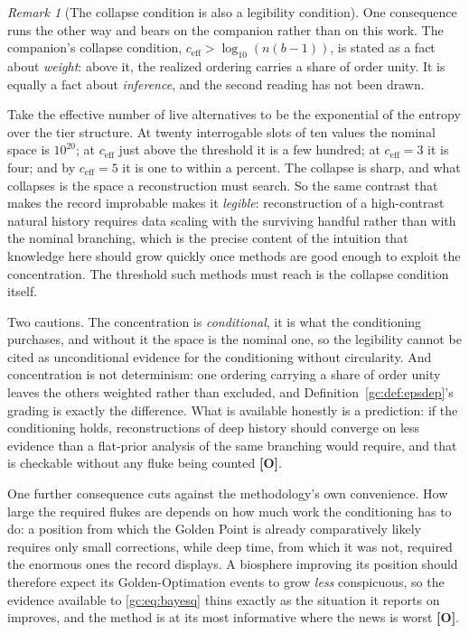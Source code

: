 \documentclass[11pt]{article}
\numberwithin{equation}{section}
\theoremstyle{plain}
\theoremstyle{definition}
\theoremstyle{remark}
\newtheorem{remark}[theorem]{Remark}
\begin{document}
\begin{remark}[The collapse condition is also a legibility condition]
\label{gc:rem:legibility}
One consequence runs the other way and bears on the companion rather than
on this work. The companion's collapse condition,
$c_{\mathrm{eff}}>\log_{10}(n(b-1))$, is stated as a fact about
\emph{weight}: above it, the realized ordering carries a share of order
unity. It is equally a fact about \emph{inference}, and the second
reading has not been drawn.

Take the effective number of live alternatives to be the exponential of
the entropy over the tier structure. At twenty interrogable slots of ten
values the nominal space is $10^{20}$; at $c_{\mathrm{eff}}$ just above
the threshold it is a few hundred; at $c_{\mathrm{eff}}=3$ it is four;
and by $c_{\mathrm{eff}}=5$ it is one to within a percent. The collapse
is sharp, and what collapses is the space a reconstruction must search.
So the same contrast that makes the record improbable makes it
\emph{legible}: reconstruction of a high-contrast natural history
requires data scaling with the surviving handful rather than with the
nominal branching, which is the precise content of the intuition that
knowledge here should grow quickly once methods are good enough to
exploit the concentration. The threshold such methods must reach is the
collapse condition itself.

Two cautions. The concentration is \emph{conditional}, it is what the
conditioning purchases, and without it the space is the nominal one, so the legibility cannot be cited as unconditional evidence for the
conditioning without circularity. And concentration is not determinism:
one ordering carrying a share of order unity leaves the others weighted
rather than excluded, and Definition~\ref{gc:def:epsdep}'s grading is exactly the
difference. What is available honestly is a prediction: if the
conditioning holds, reconstructions of deep history should converge on
less evidence than a flat-prior analysis of the same branching would
require, and that is checkable without any fluke being counted
\textbf{[O]}.
\end{remark}

One further consequence cuts against the methodology's own convenience.
How large the required flukes are depends on how much work the
conditioning has to do: a position from which the Golden Point is already comparatively
likely requires only small corrections, while deep time, from which it
was not, required the enormous ones the record displays. A biosphere
improving its position should therefore expect its Golden-Optimation
events to grow \emph{less} conspicuous, so the evidence available to
\eqref{gc:eq:bayesq} thins exactly as the situation it reports on
improves, and the method is at its most informative where the news is
worst \textbf{[O]}.
\end{document}
